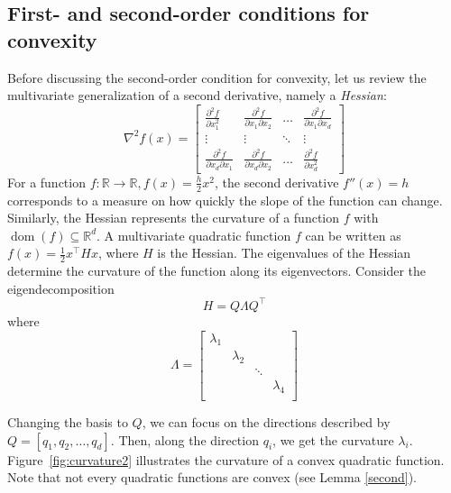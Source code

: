\documentclass{article}
\DeclareMathOperator*{\dom}{dom}
\newcommand{\R}{\mathbb{R}}
\begin{document}
\subsection{First- and second-order conditions for convexity}
Before discussing the second-order condition for convexity, let us review the multivariate generalization of a second derivative, namely a \emph{Hessian}:
\[
\nabla^2 f(x) = \begin{bmatrix}
\frac{\partial^2 f}{\partial x_1^2} & \frac{\partial^2 f}{\partial x_1 \partial x_2} & \ldots & \frac{\partial^2 f}{\partial x_1 \partial x_d}\\
\vdots & \vdots & \ddots & \vdots\\
\frac{\partial^2 f}{\partial x_d \partial x_1} & \frac{\partial^2 f}{\partial x_d \partial x_2} & \ldots & \frac{\partial^2 f}{\partial x_d^2}
\end{bmatrix}
\]
For a function $f:\R\to\R, f(x) = \frac{h}{2}x^{2}$, the second derivative $f''(x) = h$ corresponds to a measure on how quickly the slope of the function can change. Similarly, the Hessian represents the curvature of a function $f$ with $\dom(f)\subseteq \R^d$. A multivariate quadratic function $f$ can be written as $f(x) = \frac{1}{2}x^\top Hx $, where $H$ is the Hessian. The eigenvalues of the Hessian determine the curvature of the function along its eigenvectors. Consider the eigendecomposition\footnotemark[3]
\begin{equation}\label{eigendec}
	H = Q\Lambda Q^\top
\end{equation}{}
where
\[
  \Lambda = \begin{bmatrix}
    \lambda_1 & & & \\
    & \lambda_2 & & \\
    & & \ddots & \\
    & & & \lambda_4 \\
  \end{bmatrix}
\]

Changing the basis to $Q$, we can focus on the directions described by $Q=[q_{1},q_{2},\ldots,q_{d}]$. Then, along the direction $q_{i}$, we get the curvature $\lambda_{i}$. Figure~\ref{fig:curvature2} illustrates the curvature of a convex quadratic function. Note that not every quadratic functions are convex (see Lemma \ref{second}).
\end{document}
